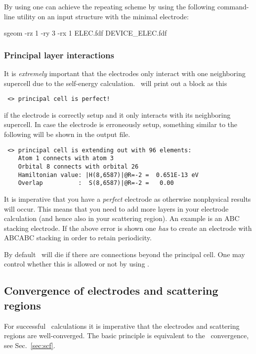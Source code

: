 By using \sisl\cite{sisl} one can achieve the repeating scheme by
using the following command-line utility on an input
 structure with the minimal electrode:
\begin{codeexample}
  sgeom -rz 1 -ry 3 -rx 1 ELEC.fdf DEVICE_ELEC.fdf
\end{codeexample}



\subsubsection{Principal layer interactions} %
%

It is \emph{extremely} important that the electrodes only interact
with one neighboring supercell due to the self-energy
calculation\cite{Sancho1985}. \tsiesta\ will print out a block as this
\begin{verbatim}
 <> principal cell is perfect!
\end{verbatim}
if the electrode is correctly setup and it only interacts with its
neighboring supercell.
%
In case the electrode is erroneously setup, something similar to the
following will be shown in the output file.
\begin{verbatim}
 <> principal cell is extending out with 96 elements:
    Atom 1 connects with atom 3
    Orbital 8 connects with orbital 26
    Hamiltonian value: |H(8,6587)|@R=-2 =  0.651E-13 eV
    Overlap          :  S(8,6587)|@R=-2 =   0.00    
\end{verbatim}
It is imperative that you have a \emph{perfect} electrode as otherwise
nonphysical results will occur. This means that you need to add more
layers in your electrode calculation (and hence also in your
scattering region). An example is an ABC stacking electrode. If the
above error is shown one \emph{has} to create an electrode with ABCABC
stacking in order to retain periodicity.

By default \tsiesta\ will die if there are connections beyond the
principal cell. One may control whether this is allowed or not by
using .




\subsection{Convergence of electrodes and scattering regions}

For successful \tsiesta\ calculations it is imperative that the
electrodes and scattering regions are well-converged.
%
The basic principle is equivalent to the \siesta\ convergence, see
Sec.~\ref{sec:scf}.

